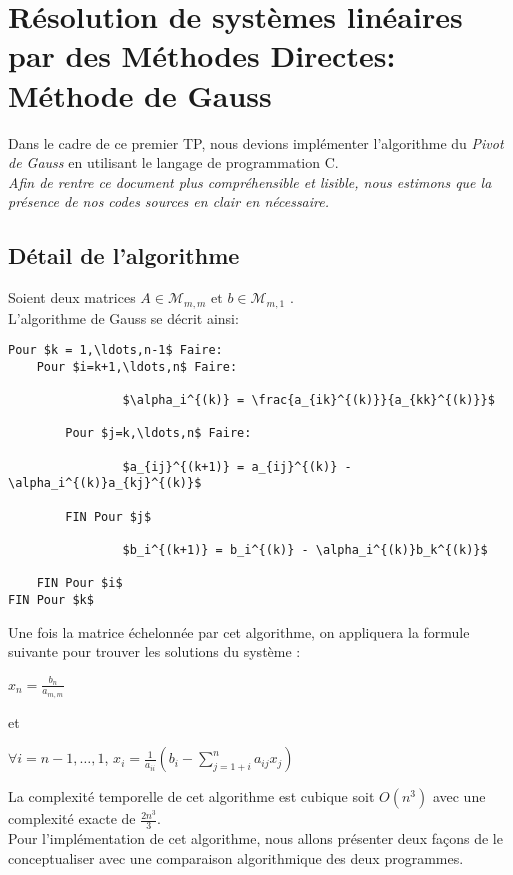 \chapter{Résolution de systèmes linéaires par des Méthodes Directes: Méthode de Gauss}
Dans le cadre de ce premier TP, nous devions implémenter l'algorithme du \emph{Pivot de Gauss} en utilisant le langage de programmation C.\\
\textit{Afin de rentre ce document plus compréhensible et lisible, nous estimons que la présence de nos codes sources en clair en nécessaire.} \\
\section{Détail de l'algorithme}
Soient deux matrices $A \in \mathcal{M}_{m,m} \text{ et  } b \in \mathcal{M}_{m,1}$ . \\
L'algorithme de Gauss se décrit ainsi: \\
\label{algo}
\begin{lstlisting}[mathescape=true, frame=single]
Pour $k = 1,\ldots,n-1$ Faire:
	Pour $i=k+1,\ldots,n$ Faire:

				$\alpha_i^{(k)} = \frac{a_{ik}^{(k)}}{a_{kk}^{(k)}}$ 
		
		Pour $j=k,\ldots,n$ Faire:

		   		$a_{ij}^{(k+1)} = a_{ij}^{(k)} - \alpha_i^{(k)}a_{kj}^{(k)}$
	
		FIN Pour $j$

				$b_i^{(k+1)} = b_i^{(k)} - \alpha_i^{(k)}b_k^{(k)}$

	FIN Pour $i$
FIN Pour $k$
\end{lstlisting}
\newpage
Une fois la matrice échelonnée par cet algorithme, on appliquera la formule suivante pour trouver les solutions du système : \\
\begin{mdframed}
\begin{center}
\begin{large}
$ x_n = \frac{b_n}{a_{m,m}}$ \\
\end{large}
\end{center}
et \\
\begin{center}
\begin{large}
$ \forall i = n-1, \ldots, 1$, $x_i = \frac{1}{a_{ii}}\left( b_i-\sum\limits_{j=1+i}^n a_{ij}x_j \right)$\\
\end{large}
\end{center}
\end{mdframed}
La complexité temporelle de cet algorithme est cubique soit $O(n^3)$ avec une complexité exacte de $\frac{2n^3}{3}$. \\
Pour l'implémentation de cet algorithme, nous allons présenter deux façons de le conceptualiser avec une comparaison algorithmique des deux programmes. \\
